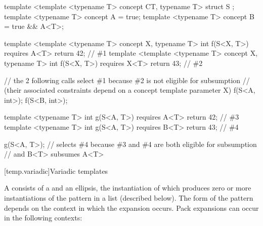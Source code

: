 \documentclass{wg21}
\begin{document}
\begin{addedblock}
\begin{example}
    \begin{codeblock}
        template <template <typename T> concept CT, typename T>
        struct S {};
        template <typename T>
        concept A = true;
        template <typename T>
        concept B = true && A<T>;

        template <template <typename T>  concept X, typename T>
        int f(S<X, T>) requires A<T> { return 42; } // \#1
        template <template <typename T> concept X, typename T>
        int f(S<X, T>) requires X<T> { return 43; } // \#2

        // the 2 following calls select \#1 because \#2 is not eligible for subsumption
        // (their associated constraints depend on a concept template parameter X)
        f(S<A, int>{});
        f(S<B, int>{});

        template <typename T>
        int g(S<A, T>) requires A<T> { return 42; } // \#3
        template <typename T>
        int g(S<A, T>) requires B<T> { return 43; } // \#4

        g(S<A, T>{}); // selects \#4 because \#3 and \#4 are both eligible for subsumption
        // and B<T> subsumes A<T>

    \end{codeblock}
\end{example}
\end{addedblock}

[temp.variadic]{Variadic templates}

\pnum
{}%
A 
consists of a  and an ellipsis, the instantiation of which
produces zero or more instantiations of the pattern in a list (described below).
The form of the pattern
depends on the context in which the expansion occurs. Pack
expansions can occur in the following contexts:
\end{document}
